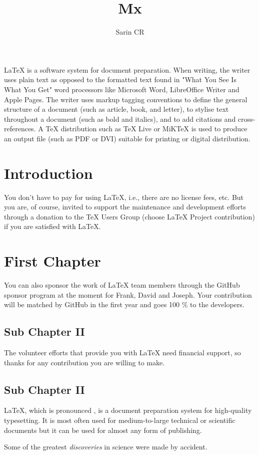 \documentclass[10pt,a4paper]{article}
\title{Mx}
\author{Sarin CR}
\begin{document}
\maketitle
\tableofcontents
\newpage
LaTeX  is a software system for document preparation. When writing, the writer uses plain text as opposed to the formatted text found in "What You See Is What You Get" word processors like Microsoft Word, LibreOffice Writer and Apple Pages. The writer uses markup tagging conventions to define the general structure of a document (such as article, book, and letter), to stylise text throughout a document (such as bold and italics), and to add citations and cross-references. A TeX distribution such as TeX Live or MiKTeX is used to produce an output file (such as PDF or DVI) suitable for printing or digital distribution. 

\section{Introduction}
You don't have to pay for using LaTeX, i.e., there are no license fees, etc. But you are, of course, invited to support the maintenance and development efforts through a donation to the TeX Users Group (choose LaTeX Project contribution) if you are satisfied with LaTeX.
\section{First Chapter}
You can also sponsor the work of LaTeX team members through the GitHub sponsor program at the moment for Frank, David and Joseph. Your contribution will be matched by GitHub in the first year and goes 100 \% to the developers. 
\subsection{Sub Chapter II}
The volunteer efforts that provide you with LaTeX need financial support, so thanks for any contribution you are willing to make.
\subsection{Sub Chapter II}
LaTeX, which is pronounced  , is a document preparation system for high-quality typesetting. It is most often used for medium-to-large technical or scientific documents but it can be used for almost any form of publishing.

Some of the greatest \emph{discoveries} 
in science 
were made by accident.
\end{document}
